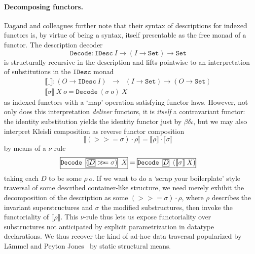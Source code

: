 \documentclass[preprint]{sigplanconf}
\begin{document}
\paragraph{Decomposing functors.} Dagand and colleagues further
note that their syntax of descriptions for indexed functors is, by virtue of being
a syntax, itself presentable as the free monad of a functor. The
description decoder
\[
  \mathtt{Decode} : \mathtt{IDesc}\:I \to (I \to \mathtt{Set})
  \to \mathtt{Set}
\]
is structurally recursive in the description and lifts pointwise to
an interpretation of substitutions in the \(\mathtt{IDesc}\) monad
\[\begin{array}{l}
  \llbracket\_\rrbracket :
  (O \to \mathtt{IDesc}\:I) \;\;\to\;\;
     (I \to \mathtt{Set}) \to  (O \to \mathtt{Set}) \\
  \llbracket \sigma \rrbracket\:X\:o = \mathtt{Decode}\:(\sigma\:o)\:X
\end{array}\]
as indexed
functors with a `map' operation satisfying functor laws. However, not
only does this interpretation \emph{deliver} functors, it is
\emph{itself} a contravariant functor: the identity substitution yields
the identity functor just by $\beta\delta\iota$, but we may also
interpret Kleisli composition as reverse functor composition
\[
  \llbracket (>\!\!>\!\!=\sigma)\cdot\rho \rrbracket =
    \llbracket \rho \rrbracket \cdot \llbracket \sigma \rrbracket
\]
by means of a $\nu$-rule
\[
  \fbc{Decode~\fbb{$(\fba{$D$}>\!\!>\!\!=\sigma)$}~$X$} =
  \fbb{Decode~\fba{$D$}~$(\llbracket\sigma\rrbracket\:X)$}
\]
taking each $D$ to be some $\rho\:o$. If we want to do a `scrap your
boilerplate' style traversal of some described container-like
structure, we need merely exhibit the decomposition of the description as some
$(>\!\!>\!\!=\sigma)\cdot\rho$, where $\rho$ describes the invariant
superstructures and $\sigma$ the modified substructures, then invoke
the functoriality of $\llbracket \rho \rrbracket$. This $\nu$-rule
thus lets us expose functoriality over substructures not anticipated by explicit
parametrization in datatype declarations. We thus recover the kind of
ad-hoc data traversal popularized by L\"ammel and Peyton
Jones~\cite{DBLP:conf/tldi/LammelJ03} by static structural means.
\end{document}
